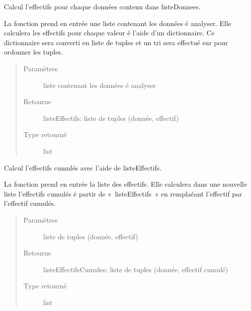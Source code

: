 \documentclass[letterpaper,10pt,french]{sphinxmanual}
\begin{document}
\begin{fulllineitems}
\label{\detokenize{addQualitatives:add.addQualitatives.calculEffectifs}}
Calcul l’effectifs pour chaque données contenu dans listeDonnees.

La fonction prend en entrée une liste contenant les données é analyser. Elle calculera les effectifs pour chaque valeur é 
l’aide d’un dictionnaire. Ce dictionnaire sera converti en liste de tuples et un tri sera effectué sur pour ordonner les
tuples.
\begin{quote}\begin{description}
\item[{Paramètres}] \leavevmode
{} \textendash{} liste contenant les données é analyser

\item[{Retourne}] \leavevmode
listeEffectifs: liste de tuples (donnée, effectif)

\item[{Type retourné}] \leavevmode
list

\end{description}\end{quote}

\end{fulllineitems}


\begin{fulllineitems}
\label{\detokenize{addQualitatives:add.addQualitatives.calculEffectifsCumules}}
Calcul l’effectifs cumulés avec l’aide de listeEffectifs.

La fonction prend en entrée la liste des effectifs. Elle calculera dans une nouvelle liste l’effectifs cumulés é partir 
de « listeEffectifs » en remplaéant l’effectif par l’effectif cumulés.
\begin{quote}\begin{description}
\item[{Paramètres}] \leavevmode
{} \textendash{} liste de tuples (donnée, effectif)

\item[{Retourne}] \leavevmode
listeEffectifsCumules: liste de tuples (donnée, effectif cumulé)

\item[{Type retourné}] \leavevmode
list

\end{description}\end{quote}

\end{fulllineitems}
\end{document}
